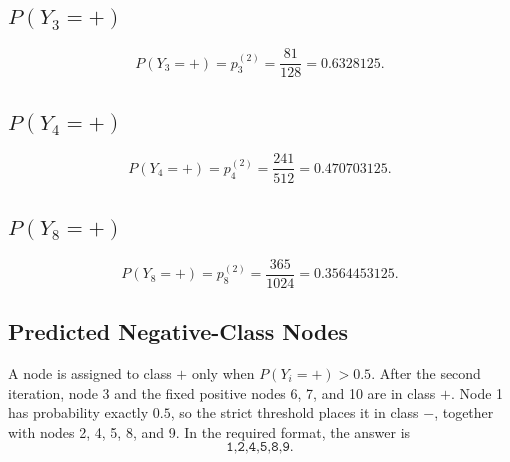 \subsection{\texorpdfstring{$P(Y_3=+)$}{P(Y3=+)}}

\begin{solution}
\[
  \boxed{
    P(Y_3=+)=p_3^{(2)}
    =\frac{81}{128}
    =0.6328125
  }.
\]
\end{solution}

\subsection{\texorpdfstring{$P(Y_4=+)$}{P(Y4=+)}}

\begin{solution}
\[
  \boxed{
    P(Y_4=+)=p_4^{(2)}
    =\frac{241}{512}
    =0.470703125
  }.
\]
\end{solution}

\subsection{\texorpdfstring{$P(Y_8=+)$}{P(Y8=+)}}

\begin{solution}
\[
  \boxed{
    P(Y_8=+)=p_8^{(2)}
    =\frac{365}{1024}
    =0.3564453125
  }.
\]
\end{solution}

\subsection{Predicted Negative-Class Nodes}

\begin{solution}
A node is assigned to class $+$ only when $P(Y_i=+)>0.5$. After the
second iteration, node 3 and the fixed positive nodes 6, 7, and 10 are in
class $+$. Node 1 has probability exactly $0.5$, so the strict threshold
places it in class $-$, together with nodes 2, 4, 5, 8, and 9. In the
required format, the answer is
\[
  \boxed{\texttt{1,2,4,5,8,9}}.
\]
\end{solution}
